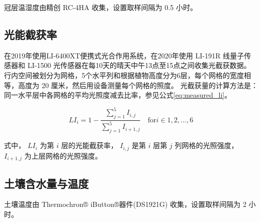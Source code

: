 冠层温湿度由精创 RC-4HA 收集，设置取样间隔为 0.5 小时。

\subsection{光能截获率}

在2019年使用LI-6400XT便携式光合作用系统，在2020年使用 LI-191R 线量子传感器和 LI-1500 光传感器在每10天的晴天中午13点至15点之间收集光截获数据。
行内空间被划分为网格，5个水平列和根据植物高度分为6层，每个网格的宽度相等，高度为 20 厘米，然后用设备测量每个网格的照度。
光截获量的计算方法是：同一水平层中各网格的平均光照度减去比率，参见公式\ref{eq:measured_li}。

\begin{equation}\label{eq:measured_li}
    LI_{i} = 1 - \frac{\sum^5_{j=1} I_{i,j}}{\sum^5_{j=1} I_{i+1,j}} \quad \mathrm{for} i \in {1,2,\dots,6}
\end{equation}

式中， $LI_{i}$ 为第 $i$ 层的光能截获率， $I_{i,j}$ 是第 $i$ 层第 $j$ 列网格的光照强度， $I_{i+1,j}$ 为上层网格的光照强度。

\subsection{土壤含水量与温度}

土壤温度由 Thermochron® iButton®器件(DS1921G) 收集，设置取样间隔为 2 小时。

